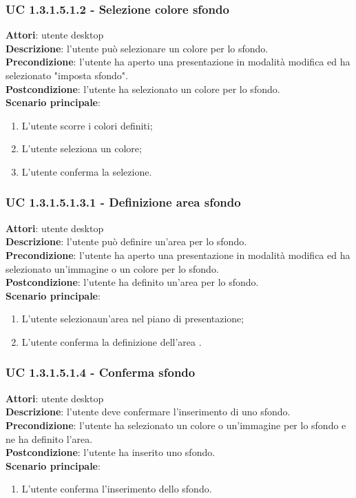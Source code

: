 \subsubsection{UC 1.3.1.5.1.2 - Selezione colore sfondo}{
	\label{uc1.3.1.5.1.2}
	\textbf{Attori}: utente desktop \\
	\textbf{Descrizione}: l'utente può selezionare un colore per lo sfondo. \\
	\textbf{Precondizione}: l'utente ha aperto una presentazione in modalità modifica ed ha selezionato "imposta sfondo".	\\
	\textbf{Postcondizione}: l'utente ha selezionato un colore per lo sfondo.	\\
	\textbf{Scenario principale}:
	\begin{enumerate}
		\item L'utente scorre i colori definiti;
		\item L'utente seleziona un colore;
		\item L'utente conferma la selezione.
	\end{enumerate}
}
\subsubsection{UC 1.3.1.5.1.3.1 - Definizione area sfondo}{
	\label{uc1.3.1.5.1.3.1}
	\textbf{Attori}: utente desktop \\
	\textbf{Descrizione}: l'utente può definire un'area per lo sfondo. \\
	\textbf{Precondizione}: l'utente ha aperto una presentazione in modalità modifica ed ha selezionato un'immagine o un colore per lo sfondo.	\\
	\textbf{Postcondizione}: l'utente ha definito un'area per lo sfondo.	\\
	\textbf{Scenario principale}:
	\begin{enumerate}
		\item L'utente selezionaun'area nel piano di presentazione;
		\item L'utente conferma la definizione dell'area .
	\end{enumerate}
}

\subsubsection{UC 1.3.1.5.1.4 - Conferma sfondo}{
	\label{uc1.3.1.5.1.4}
	\textbf{Attori}: utente desktop \\
	\textbf{Descrizione}: l'utente deve confermare l'inserimento di uno sfondo. \\
	\textbf{Precondizione}: l'utente ha selezionato un colore o un'immagine per lo sfondo e ne ha definito l'area.	\\
	\textbf{Postcondizione}: l'utente ha inserito uno sfondo.	\\
	\textbf{Scenario principale}:
	\begin{enumerate}
		\item L'utente conferma l'inserimento dello sfondo.
	\end{enumerate}
}
